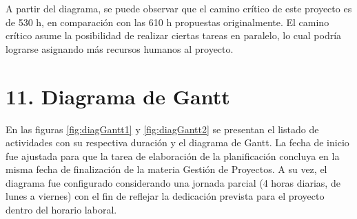 \documentclass[
11pt, %
codirector, %
]{charter}
\begin{document}
A partir del diagrama, se puede observar que el camino crítico de este proyecto es de 530 h, en comparación con las 610 h propuestas originalmente. El camino crítico asume la posibilidad de realizar ciertas tareas en paralelo, lo cual podría lograrse asignando más recursos humanos al proyecto.
 


\section{11. Diagrama de Gantt}
\label{sec:gantt}

En las figuras \ref{fig:diagGantt1} y \ref{fig:diagGantt2} se presentan el listado de actividades con su respectiva duración y el diagrama de Gantt. La fecha de inicio fue ajustada para que la tarea de elaboración de la planificación concluya en la misma fecha de finalización de la materia Gestión de Proyectos. A su vez, el diagrama fue configurado considerando una jornada parcial (4 horas diarias, de lunes a viernes) con el fin de reflejar la dedicación prevista para el proyecto dentro del horario laboral.

\vspace{10px}
\end{document}
